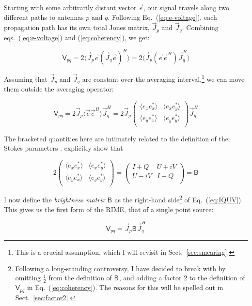 \documentclass[referee]{aa}
\newcommand{\matrixtt}[4]{\left( \begin{array}{cc}#1&#2\\#3&#4\\\end{array} \right)}
\newcommand{\herm}{H}
\newcommand{\jones}[2]{\vec {#1}_{#2}}
\newcommand{\jonesT}[2]{\vec {#1}^{\herm}_{#2}}
\newcommand{\coh}[2]{\mathsf{{#1}}_{{#2}}}
\begin{document}
Starting with some arbitrarily distant vector $\vec e$, our signal travels along two different paths to antennas $p$ and $q$. Following Eq.~(\ref{eq:e-voltage}), each propagation path has its own total Jones matrix, $\jones{J}{p}$ and $\jones{J}{q}$. Combining eqs.~(\ref{eq:e-voltage}) and (\ref{eq:coherency}), we get:

    \begin{equation}\label{eq:corr1}
    \coh{V}{pq} = 2 \langle  \jones{J}{p} \vec e ( \jones{J}{q} \vec e )^\herm \rangle  = 2 \langle  \jones{J}{p} (\vec e \vec e^\herm) \jonesT{J}{q} \rangle 
    \end{equation}

Assuming that $\jones{J}{p}$ and $\jones{J}{q}$ are constant over the averaging interval,\footnote{This is a crucial assumption, which I will revisit in Sect.~\ref{sec:smearing}.} we can move them outside the averaging operator:

    \begin{equation}\label{eq:corr2}
    \coh{V}{pq} = 2 \jones{J}{p} \langle  \vec e \vec e^\herm \rangle  \jonesT{J}{q} = 
    2 \jones{J}{p} 
    \matrixtt{\langle e_x e^*_x\rangle }{\langle e_x e^*_y\rangle }{\langle e_y e^*_x\rangle }{\langle e_y e^*_y\rangle }
    \jonesT{J}{q}
    \end{equation}

The bracketed quantities here are intimately related to the definition of the Stokes parameters \citep{born-wolf,tms}. \citet{ME3} explicitly show that

    \begin{equation}\label{eq:IQUV}
    2 
    \matrixtt{\langle e_x e^*_x\rangle }{\langle e_x e^*_y\rangle }{\langle e_y e^*_x\rangle }{\langle e_y e^*_y\rangle }
    = 
    \matrixtt{I+Q}{U+iV}{U-iV}{I-Q} = \coh{B}{}
    \end{equation}

I now define the {\em brightness matrix} $\coh{B}{}$ as the right-hand side\footnote{Following a long-standing controversy, I have decided to break with \citet{ME4} by omitting $\frac{1}{2}$ from the definition of $\coh{B}{}$, and adding a factor 2 to the definition of $\coh{V}{pq}$ in Eq.~(\ref{eq:coherency}). The reasons for this will be spelled out in Sect.~\ref{sec:factor2}.} of Eq.~(\ref{eq:IQUV}). This gives us the first form of the RIME, that of a single point source:

    \begin{equation}\label{eq:me0}
    \coh{V}{pq} = \jones{J}{p} \coh{B}{}  \jonesT{J}{q}
    \end{equation}
\end{document}
